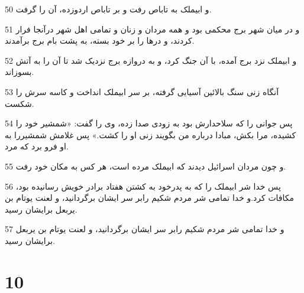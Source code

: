 \par 50 و ابیملک به تاباص رفت و بر تاباص اردوزده، آن را گرفت.
\par 51 و در میان شهر برج محکمی بود و همه مردان و زنان و تمامی اهل شهر درآنجا فرار کردند، و درها را بر خود بسته، به پشت بام برج برآمدند.
\par 52 و ابیملک نزد برج آمده، با آن جنگ کرد، و به دروازه برج نزدیک شد تا آن را به آتش بسوزاند.
\par 53 آنگاه زنی سنگ بالائین آسیایی گرفته، بر سر ابیملک انداخت و کاسه سرش را شکست.
\par 54 پس جوانی را که سلاحدارش بود به زودی صدا زده، وی را گفت: «شمشیر خود را کشیده، مرا بکش، مبادا درباره من بگویند زنی او را کشت.» پس غلامش شمشیررا به او فرو برد که مرد.
\par 55 و چون مردان اسرائیل دیدند که ابیملک مرده است، هر کس به مکان خود رفت.
\par 56 پس خدا شر ابیملک را که به پدرخود به کشتن هفتاد برادر خویش رسانیده بود، مکافات کرد.و خدا تمامی شر مردم شکیم رابر سر ایشان برگردانید، و لعنت یوتام بن یربعل برایشان رسید.
\par 57 و خدا تمامی شر مردم شکیم رابر سر ایشان برگردانید، و لعنت یوتام بن یربعل برایشان رسید.
 
\chapter{10}

